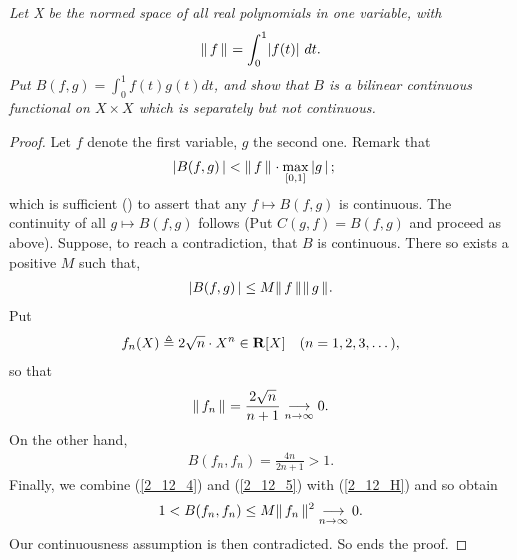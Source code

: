 \textit{%
Let X be the normed space of all real polynomials in one variable, with %
%
  \begin{align*}
    \| \,f \, \|_{}=\int_0^1\lvert f(t)\rvert\ dt.
\end{align*}
%
Put  %
  $B(f, g)=\int _0^1 f(t)g(t) dt $, %
%
and show that $B$ is a bilinear continuous functional on $X\times X$ %
which is separately but not continuous.
}
\begin{proof} Let $f$ denote the first variable, $g$ the second one. %
Remark that %
%
  \begin{align}\label{2_12_2}
    \left\lvert B(f, g) \,\right\rvert 
      & < \| \,f \, \|_{} \cdot \max_{[0,1]} \left\lvert g \,\right\rvert ; 
  \end{align}
%
which is sufficient () to assert that any %
%
  $f \mapsto B(f, g)$ 
%
is continuous. The continuity of all %
%
  $g \mapsto B(f,g)$ %
%
follows (Put $C(g, f) = B(f, g)$ and proceed as above). %
Suppose, to reach a contradiction, that $B$ is continuous. %
There so exists a positive $M$ such that, 
%
  \begin{align}\label{2_12_H}
    \left\lvert B(f, g) \,\right\rvert \leq M \| \,f \, \|_{}\| \,g \, \|_{}.
  \end{align}
%
Put %
%
  \begin{align}\label{2_12_3}
    f_n(X)\triangleq 2 \sqrt{n}\cdot X^{n}\in {\mathbf R}[X] \quad (n=1, 2, 3, \dots), 
  \end{align}
%
so that 
%
  \begin{align}\label{2_12_4}
    \| \,f_n \, \|_{} = \frac{2 \sqrt{n}}{n+1} \underset{n\to \infty}{\longrightarrow}0.
  \end{align}
%
On the other hand,
%
  \begin{align}\label{2_12_5}
    B(f_n, f_n)= \frac{4 n}{2n+1} > 1.
  \end{align}
%
Finally, we combine %
%
  (\ref{2_12_4}) and (\ref{2_12_5}) with (\ref{2_12_H}) %
%
and so obtain
\begin{align}
 1 < B(f_n, f_n) \leq  M \| \,f_n \, \|_{}^2  \underset{n\to \infty}{\longrightarrow} 0.
\end{align}
Our continuousness assumption is then contradicted. So ends the proof.
\end{proof}
